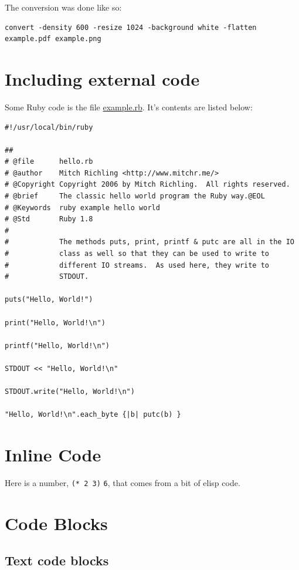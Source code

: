 \documentclass[11pt]{article}
\begin{document}
The conversion was done like so:

\begin{verbatim}
convert -density 600 -resize 1024 -background white -flatten example.pdf example.png
\end{verbatim}

\section{Including external code}
\label{sec:org425d198}

Some Ruby code is the file \url{example.rb}.  It's contents are listed below:

\begin{verbatim}
#!/usr/local/bin/ruby

##
# @file      hello.rb
# @author    Mitch Richling <http://www.mitchr.me/>
# @Copyright Copyright 2006 by Mitch Richling.  All rights reserved.
# @brief     The classic hello world program the Ruby way.@EOL
# @Keywords  ruby example hello world
# @Std       Ruby 1.8
#
#            The methods puts, print, printf & putc are all in the IO
#            class as well so that they can be used to write to
#            different IO streams.  As used here, they write to
#            STDOUT.

puts("Hello, World!")

print("Hello, World!\n")

printf("Hello, World!\n")

STDOUT << "Hello, World!\n"

STDOUT.write("Hello, World!\n")

"Hello, World!\n".each_byte {|b| putc(b) }
\end{verbatim}

\section{Inline Code}
\label{sec:org239d8cb}

Here is a number, \texttt{\texttt{(* 2 3)}} \texttt{6}, that comes from a bit of elisp code.

\section{Code Blocks}
\label{sec:org8663c64}

\subsection{Text code blocks}
\label{sec:orga77156e}
\end{document}
